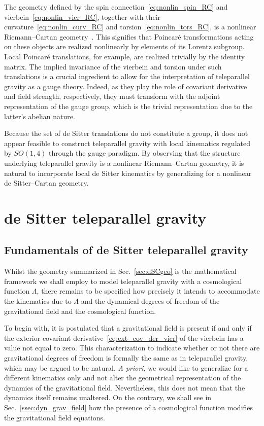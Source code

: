 \documentclass[%
aps,
prd,
reprint
]{revtex4-1}
\begin{document}
The geometry defined by the spin 
connection~\eqref{eq:nonlin_spin_RC} and 
vierbein~\eqref{eq:nonlin_vier_RC}, together with their 
curvature~\eqref{eq:nonlin_curv_RC} and 
torsion~\eqref{eq:nonlin_tors_RC}, is a nonlinear Riemann--Cartan 
geometry~\cite{stelle.west:1980ds, Jennen:2014mba}. This 
signifies that Poincar\'e transformations acting on these objects 
are realized nonlinearly by elements of its Lorentz subgroup.  
Local Poincar\'e translations, for example, are realized 
trivially by the identity matrix. The implied invariance of the 
vierbein and torsion under such translations is a crucial 
ingredient to allow for the interpretation of teleparallel 
gravity as a gauge theory.  Indeed, as they play the role of 
covariant derivative and field strength, respectively, they must 
transform with the adjoint representation of the gauge group, 
which is the trivial representation due to the latter's abelian 
nature.

Because the set of de Sitter translations do not constitute 
a group, it does not appear feasible to construct teleparallel 
gravity with local kinematics regulated by $SO(1,4)$ through the 
gauge paradigm. By observing that the structure underlying 
teleparallel gravity is a nonlinear Riemann--Cartan geometry, it 
is natural to incorporate local de Sitter kinematics by 
generalizing for a nonlinear de Sitter--Cartan geometry.


\section{de Sitter teleparallel gravity}
\label{sec:dStg}

\subsection{Fundamentals of de Sitter teleparallel gravity}

Whilst the geometry summarized in Sec.~\ref{sec:dSCgeo} is the 
mathematical framework we shall employ to model teleparallel 
gravity with a cosmological function $\Lambda$, there remains to 
be specified how precisely it intends to accommodate the 
kinematics due to $\Lambda$ and the dynamical degrees of freedom 
of the gravitational field and the cosmological function.

To begin with, it is postulated that a gravitational field is 
present if and only if the exterior covariant 
derivative~\eqref{eq:ext_cov_der_vier} of the vierbein has 
a value not equal to zero. This characterization to indicate 
whether or not there are gravitational degrees of freedom is 
formally the same as in teleparallel gravity, which may be argued 
to be natural. \emph{A priori}, we would like to generalize for 
a different kinematics only and not alter the geometrical 
representation of the dynamics of the gravitational field.  
Nevertheless, this does not mean that the dynamics itself remains 
unaltered. On the contrary, we shall see in 
Sec.~\ref{ssec:dyn_grav_field} how the presence of a cosmological 
function modifies the gravitational field equations.
\end{document}
